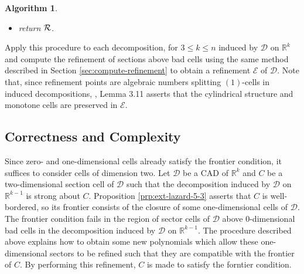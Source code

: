 \documentclass[
]{book}
\newtheorem{algorithm}{Algorithm}
\theoremstyle{definition}
\theoremstyle{definition}
\theoremstyle{definition}
\theoremstyle{definition}
\theoremstyle{remark}
\begin{document}
\begin{algorithm}
\begin{itemize}
\begin{itemize}
\begin{itemize}
      This may be done by computing a Groebner basis eliminating \(z\).
    \item
      Finally, to obtain refinement polynomials for \(D\), substitute
      \[
      L := \{ {\mathrm{sub}}_{\mathbf{b}}(f) \in \mathbb{Q}[x_k] \mid f \in S_1 \cup S_2 \}.
      \]
    \item
      Refinement points are the roots
      \[
      (c_1,\ldots,c_t)
      \]
      of polynomials in \(L\).
    \item
      Let
      \[
      {\cal R} := {\cal R} \cup \{ {\cal R}_{\mathbf{b}} = (c_1,\ldots,c_t) \}.
      \]
    \end{itemize}
  \end{itemize}
\item
  return \(\cal R\).
\end{itemize}

\end{algorithm}

Apply this procedure to each decomposition, for \(3 \le k \le n\) induced by \(\mathcal{D}\) on \(\mathbb{R}^k\) and compute the refinement of sections above bad cells using the same method described in Section \ref{sec:compute-refinement} to obtain a refinement \(\mathcal{E}\) of \(\mathcal{D}\). Note that, since refinement points are algebraic numbers splitting \((1)\)-cells in induced decompositions, \citet{bgv15}, Lemma 3.11 asserts that the cylindrical structure and monotone cells are preserved in \(\mathcal{E}\).

\hypertarget{correctness-and-complexity-2}{%
\subsection{Correctness and Complexity}\label{correctness-and-complexity-2}}

Since zero- and one-dimensional cells already satisfy the frontier condition, it suffices to consider cells of dimension two.
Let \(\mathcal{D}\) be a CAD of \(\mathbb{R}^k\) and \(C\) be a two-dimensional section cell of \(\mathcal{D}\) such that the decomposition induced by \(\mathcal{D}\) on \(\mathbb{R}^{k-1}\) is strong about \(C\). Proposition \ref{prp:ext-lazard-5-3} asserts that \(C\) is well-bordered, so its frontier consists of the closure of some one-dimensional cells of \(\mathcal{D}\). The frontier condition fails in the region of sector cells of \(\mathcal{D}\) above \(0\)-dimensional bad cells in the decomposition induced by \(\mathcal{D}\) on \(\mathbb{R}^{k-1}\).
The procedure described above explains how to obtain some new polynomials which allow these one-dimensional sectors to be refined such that they are compatible with the frontier of \(C\). By performing this refinement, \(C\) is made to satisfy the forntier condition.
\end{document}
